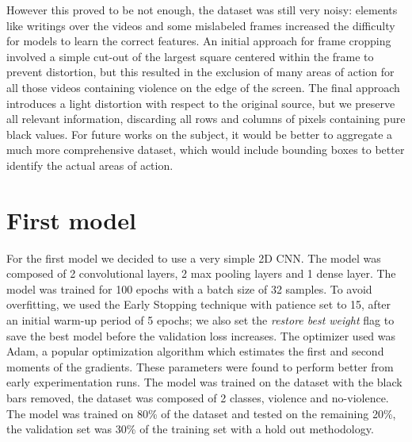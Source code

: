 However this proved to be not enough, the dataset was still very noisy: elements like writings over the videos and some mislabeled frames increased the difficulty for models to learn the correct features. An initial approach for frame cropping involved a simple cut-out of the largest square centered within the frame to prevent distortion, but this resulted in the exclusion of many areas of action for all those videos containing violence on the edge of the screen. The final approach introduces a light distortion with respect to the original source, but we preserve all relevant information, discarding all rows and columns of pixels containing pure black values. For future works on the subject, it would be better to aggregate a much more comprehensive dataset, which would include bounding boxes to better identify the actual areas of action.

\section{First model}
For the first model we decided to use a very simple 2D CNN. The model was composed of 2 convolutional layers, 2 max pooling layers and 1 dense layer. The model was trained for 100 epochs with a batch size of 32 samples. To avoid overfitting, we used the Early Stopping technique with patience set to 15, after an initial warm-up period of 5 epochs; we also set the \textit{restore best weight} flag to save the best model before the validation loss increases. The optimizer used was Adam, a popular optimization algorithm which estimates the first and second moments of the gradients. These parameters were found to perform better from early experimentation runs. The model was trained on the dataset with the black bars removed, the dataset was composed of 2 classes, violence and no-violence. The model was trained on 80\% of the dataset and tested on the remaining 20\%, the validation set was 30\% of the training set with a hold out methodology.  

